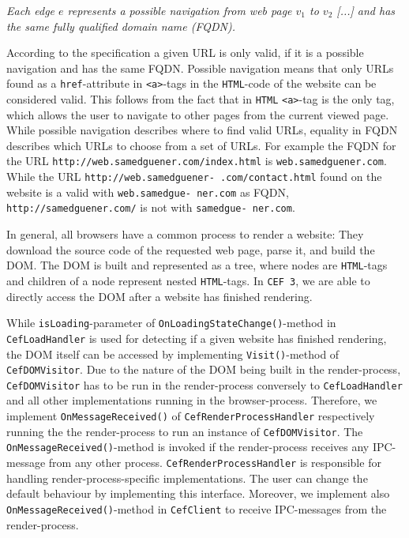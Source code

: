 \begin{center}
	\textit{Each edge $e$ represents a possible navigation from web page $v_1$ to $v_2$ [...] and has the same fully qualified domain name (FQDN).}
\end{center}

According to the specification a given URL is only valid, if it is a possible navigation and has the same FQDN. Possible navigation means that only URLs found as a \texttt{href}-attribute in \texttt{<a>}-tags in the \texttt{HTML}-code of the website can be considered valid. This follows from the fact that in \texttt{HTML} \texttt{<a>}-tag is the only tag, which allows the user to navigate to other pages from the current viewed page. While possible navigation describes where to find valid URLs, equality in FQDN describes which URLs to choose from a set of URLs.
For example the FQDN for the URL \texttt{http://web.samedguener.com/index.html} is \texttt{web.samedguener.com}. While the URL \texttt{http://web.samedguener-
.com/contact.html} found on the website is a valid with \texttt{web.samedgue-
ner.com} as FQDN, \texttt{http://samedguener.com/} is not with \texttt{samedgue-
ner.com}.

In general, all browsers have a common process to render a website: They download the source code of the requested web page, parse it, and build the DOM. The DOM is built and represented as a tree, where nodes are \texttt{HTML}-tags and children of a node represent nested \texttt{HTML}-tags. In \texttt{CEF 3}, we are able to directly access the DOM after a website has finished rendering. 

While \texttt{isLoading}-parameter of \texttt{OnLoadingStateChange()}-method in \texttt{CefLoadHandler} is used for detecting if a given website has finished rendering, the DOM itself can be accessed by implementing \texttt{Visit()}-method of \texttt{CefDOMVisitor}.
Due to the nature of the DOM being built in the render-process, \texttt{CefDOMVisitor} has to be run in the render-process conversely to \texttt{CefLoadHandler} and all other implementations running in the browser-process. Therefore, we implement \texttt{OnMessageReceived()} of \texttt{CefRenderProcessHandler} respectively running the the render-process to run an instance of \texttt{CefDOMVisitor}. The \texttt{OnMessageReceived()}-method is invoked if the render-process receives any IPC-message from any other process. \texttt{CefRenderProcessHandler} is responsible for handling render-process-specific implementations. The user can change the default behaviour by implementing this interface. Moreover, we implement also \texttt{OnMessageReceived()}-method in \texttt{CefClient} to receive IPC-messages from the render-process.

